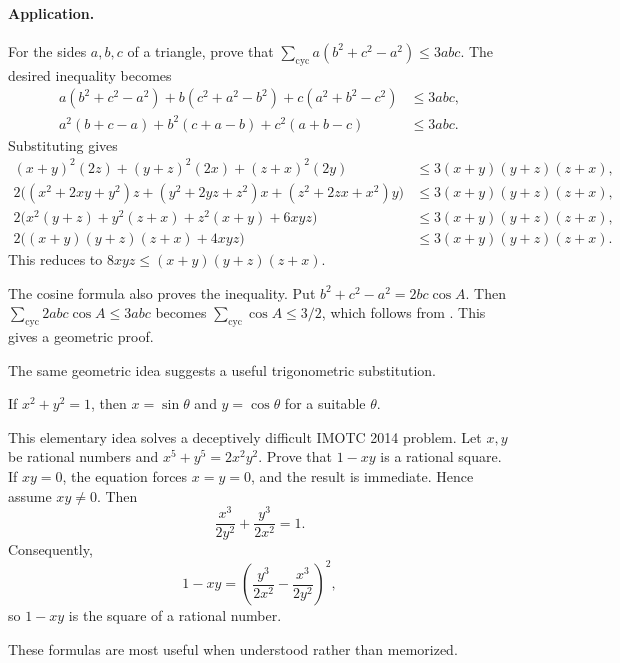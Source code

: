 \documentclass[11pt,a4paper]{article}
\begin{document}
\paragraph{Application.}
For the sides $a,b,c$ of a triangle, prove that $\sum_{\mathrm{cyc}}a(b^2+c^2-a^2)\leq3abc$.
The desired inequality becomes
\begin{align*}
a(b^2+c^2-a^2)+b(c^2+a^2-b^2)+c(a^2+b^2-c^2)&\leq3abc,\\
a^2(b+c-a)+b^2(c+a-b)+c^2(a+b-c)&\leq3abc.
\end{align*}
Substituting gives
\begin{align*}
(x+y)^2(2z)+(y+z)^2(2x)+(z+x)^2(2y)
&\leq3(x+y)(y+z)(z+x),\\
2\bigl((x^2+2xy+y^2)z+(y^2+2yz+z^2)x+(z^2+2zx+x^2)y\bigr)
&\leq3(x+y)(y+z)(z+x),\\
2\bigl(x^2(y+z)+y^2(z+x)+z^2(x+y)+6xyz\bigr)
&\leq3(x+y)(y+z)(z+x),\\
2\bigl((x+y)(y+z)(z+x)+4xyz\bigr)
&\leq3(x+y)(y+z)(z+x).
\end{align*}
This reduces to $8xyz\leq(x+y)(y+z)(z+x)$.
\begin{remark}
The cosine formula also proves the inequality. Put $b^2+c^2-a^2=2bc\cos A$.
Then $\sum_{\mathrm{cyc}}2abc\cos A\leq3abc$ becomes
$\sum_{\mathrm{cyc}}\cos A\leq3/2$, which follows from .
This gives a geometric proof.
\end{remark}

The same geometric idea suggests a useful trigonometric substitution.
\setcounter{theorem}{51}\begin{lemma}
If $x^2+y^2=1$, then $x=\sin\theta$ and $y=\cos\theta$ for a suitable $\theta$.
\end{lemma}
This elementary idea solves a deceptively difficult IMOTC 2014 problem.
Let $x,y$ be rational numbers and $x^5+y^5=2x^2y^2$. Prove that $1-xy$ is a rational square.
If $xy=0$, the equation forces $x=y=0$, and the result is immediate. Hence assume $xy\ne0$.
Then
\[
\frac{x^3}{2y^2}+\frac{y^3}{2x^2}=1.
\]
Consequently,
\[
1-xy=\left(\frac{y^3}{2x^2}-\frac{x^3}{2y^2}\right)^2,
\]
so $1-xy$ is the square of a rational number.

These formulas are most useful when understood rather than memorized.
\end{document}
